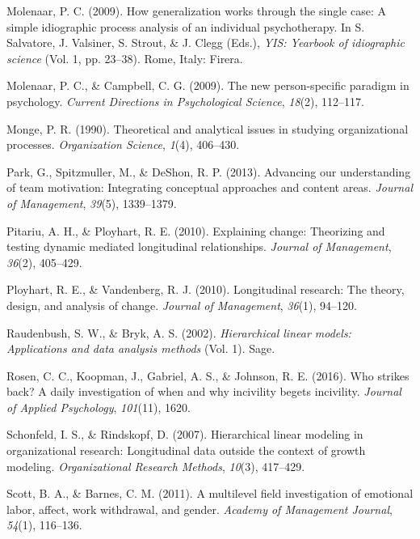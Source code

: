 \documentclass[english,,man]{apa6}
\theoremstyle{definition}
\theoremstyle{definition}
\theoremstyle{definition}
\theoremstyle{remark}
\begin{document}
\leavevmode\hypertarget{ref-molenaar2009generalization}{}%
Molenaar, P. C. (2009). How generalization works through the single
case: A simple idiographic process analysis of an individual
psychotherapy. In S. Salvatore, J. Valsiner, S. Strout, \& J. Clegg
(Eds.), \emph{YIS: Yearbook of idiographic science} (Vol. 1, pp.
23--38). Rome, Italy: Firera.

\leavevmode\hypertarget{ref-molenaar2009new}{}%
Molenaar, P. C., \& Campbell, C. G. (2009). The new person-specific
paradigm in psychology. \emph{Current Directions in Psychological
Science}, \emph{18}(2), 112--117.

\leavevmode\hypertarget{ref-monge_theoretical_1990}{}%
Monge, P. R. (1990). Theoretical and analytical issues in studying
organizational processes. \emph{Organization Science}, \emph{1}(4),
406--430.

\leavevmode\hypertarget{ref-park2013advancing}{}%
Park, G., Spitzmuller, M., \& DeShon, R. P. (2013). Advancing our
understanding of team motivation: Integrating conceptual approaches and
content areas. \emph{Journal of Management}, \emph{39}(5), 1339--1379.

\leavevmode\hypertarget{ref-pitariu_explaining_2010}{}%
Pitariu, A. H., \& Ployhart, R. E. (2010). Explaining change: Theorizing
and testing dynamic mediated longitudinal relationships. \emph{Journal
of Management}, \emph{36}(2), 405--429.

\leavevmode\hypertarget{ref-ployhart_longitudinal_2010}{}%
Ployhart, R. E., \& Vandenberg, R. J. (2010). Longitudinal research: The
theory, design, and analysis of change. \emph{Journal of Management},
\emph{36}(1), 94--120.

\leavevmode\hypertarget{ref-raudenbush2002hierarchical}{}%
Raudenbush, S. W., \& Bryk, A. S. (2002). \emph{Hierarchical linear
models: Applications and data analysis methods} (Vol. 1). Sage.

\leavevmode\hypertarget{ref-rosen_who_2016}{}%
Rosen, C. C., Koopman, J., Gabriel, A. S., \& Johnson, R. E. (2016). Who
strikes back? A daily investigation of when and why incivility begets
incivility. \emph{Journal of Applied Psychology}, \emph{101}(11), 1620.

\leavevmode\hypertarget{ref-schonfeld2007hierarchical}{}%
Schonfeld, I. S., \& Rindskopf, D. (2007). Hierarchical linear modeling
in organizational research: Longitudinal data outside the context of
growth modeling. \emph{Organizational Research Methods}, \emph{10}(3),
417--429.

\leavevmode\hypertarget{ref-scott_multilevel_2011}{}%
Scott, B. A., \& Barnes, C. M. (2011). A multilevel field investigation
of emotional labor, affect, work withdrawal, and gender. \emph{Academy
of Management Journal}, \emph{54}(1), 116--136.
\end{document}
